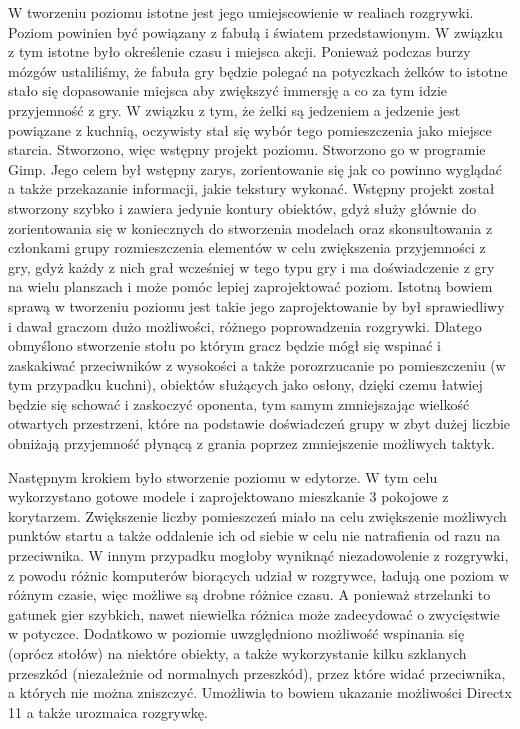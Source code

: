 W tworzeniu poziomu istotne jest jego umiejscowienie w realiach rozgrywki. Poziom powinien być powiązany z fabułą i światem przedstawionym. W związku z tym istotne było określenie czasu i miejsca akcji. Ponieważ podczas burzy mózgów ustaliliśmy, że fabuła gry będzie polegać na potyczkach żelków to istotne stało się dopasowanie miejsca aby zwiększyć immersję a co za tym idzie przyjemność z gry. W związku z tym, że żelki są jedzeniem a jedzenie jest powiązane z kuchnią, oczywisty stał się wybór tego pomieszczenia jako miejsce starcia. Stworzono, więc wstępny projekt poziomu. Stworzono go w programie Gimp. Jego celem był wstępny zarys, zorientowanie się jak co powinno wyglądać a także przekazanie informacji, jakie tekstury wykonać. Wstępny projekt został stworzony szybko i zawiera jedynie kontury obiektów, gdyż służy głównie do zorientowania się w koniecznych do stworzenia modelach oraz skonsultowania z członkami grupy rozmieszczenia elementów w celu zwiększenia przyjemności z gry, gdyż każdy z nich grał wcześniej w tego typu gry i ma doświadczenie z gry na wielu planszach i może pomóc lepiej zaprojektować poziom. Istotną bowiem sprawą w tworzeniu poziomu jest takie jego zaprojektowanie by był sprawiedliwy i dawał graczom dużo możliwości, różnego poprowadzenia rozgrywki. Dlatego obmyślono stworzenie stołu po którym gracz będzie mógł się wspinać i zaskakiwać przeciwników z wysokości a także porozrzucanie po pomieszczeniu (w tym przypadku kuchni), obiektów służących jako osłony, dzięki czemu łatwiej będzie się schować i zaskoczyć oponenta, tym samym zmniejszając wielkość otwartych przestrzeni, które na podstawie doświadczeń grupy w zbyt dużej liczbie obniżają przyjemność płynącą z grania poprzez zmniejszenie możliwych taktyk.

Następnym krokiem było stworzenie poziomu w edytorze. W tym celu wykorzystano gotowe modele i zaprojektowano mieszkanie 3 pokojowe z korytarzem. Zwiększenie liczby pomieszczeń miało na celu zwiększenie możliwych punktów startu a także oddalenie ich od siebie w celu nie natrafienia od razu na przeciwnika. W innym przypadku mogłoby wyniknąć niezadowolenie z rozgrywki, z powodu różnic komputerów biorących udział w rozgrywce, ładują one poziom w różnym czasie, więc możliwe są drobne różnice czasu. A ponieważ strzelanki to gatunek gier szybkich, nawet niewielka różnica może zadecydować o zwycięstwie w potyczce. Dodatkowo w poziomie uwzględniono możliwość wspinania się (oprócz stołów) na niektóre obiekty, a także wykorzystanie kilku szklanych przeszkód (niezależnie od normalnych przeszkód), przez które widać przeciwnika, a których nie można zniszczyć. Umożliwia to bowiem ukazanie możliwości Directx 11 a także urozmaica rozgrywkę.

